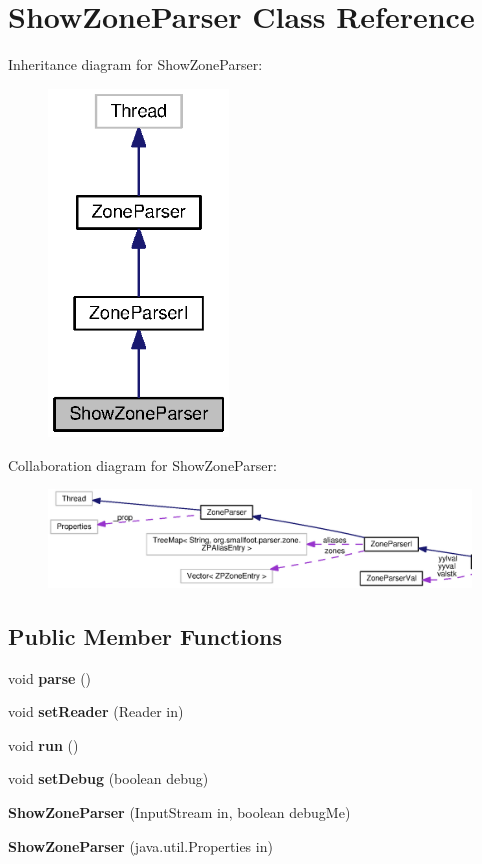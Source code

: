 \section{Show\+Zone\+Parser Class Reference}
\label{classorg_1_1smallfoot_1_1parser_1_1zone_1_1ShowZoneParser}


Inheritance diagram for Show\+Zone\+Parser\+:\nopagebreak
\begin{figure}[H]
\begin{center}
\leavevmode
\includegraphics[width=136pt]{classorg_1_1smallfoot_1_1parser_1_1zone_1_1ShowZoneParser__inherit__graph}
\end{center}
\end{figure}


Collaboration diagram for Show\+Zone\+Parser\+:
\nopagebreak
\begin{figure}[H]
\begin{center}
\leavevmode
\includegraphics[width=350pt]{classorg_1_1smallfoot_1_1parser_1_1zone_1_1ShowZoneParser__coll__graph}
\end{center}
\end{figure}
\subsection*{Public Member Functions}
\begin{DoxyCompactItemize}
\item 
void {\bf parse} ()
\item 
void {\bf set\+Reader} (Reader in)
\item 
void {\bf run} ()
\item 
void {\bf set\+Debug} (boolean debug)
\item 
{\bf Show\+Zone\+Parser} (Input\+Stream in, boolean debug\+Me)
\item 
{\bf Show\+Zone\+Parser} (java.\+util.\+Properties in)
\end{DoxyCompactItemize}

